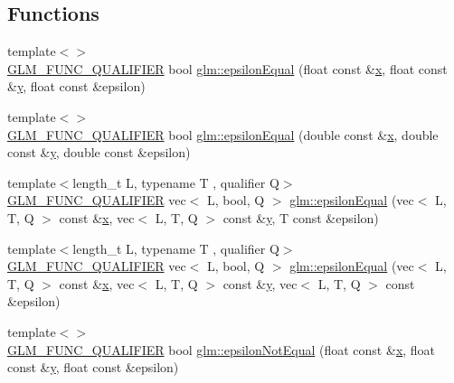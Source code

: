 \subsection*{Functions}
\begin{DoxyCompactItemize}
\item 
{\footnotesize template$<$$>$ }\\\hyperlink{setup_8hpp_a33fdea6f91c5f834105f7415e2a64407}{G\+L\+M\+\_\+\+F\+U\+N\+C\+\_\+\+Q\+U\+A\+L\+I\+F\+I\+ER} bool \hyperlink{namespaceglm_aded5e7ea9a0eacd03367ad77986c2a15}{glm\+::epsilon\+Equal} (float const \&\hyperlink{_s_d_l__opengl_8h_ad0e63d0edcdbd3d79554076bf309fd47}{x}, float const \&\hyperlink{_s_d_l__opengl_8h_a1675d9d7bb68e1657ff028643b4037e3}{y}, float const \&epsilon)
\item 
{\footnotesize template$<$$>$ }\\\hyperlink{setup_8hpp_a33fdea6f91c5f834105f7415e2a64407}{G\+L\+M\+\_\+\+F\+U\+N\+C\+\_\+\+Q\+U\+A\+L\+I\+F\+I\+ER} bool \hyperlink{namespaceglm_a6e30ea38a0e3ebc25d87e667255057e5}{glm\+::epsilon\+Equal} (double const \&\hyperlink{_s_d_l__opengl_8h_ad0e63d0edcdbd3d79554076bf309fd47}{x}, double const \&\hyperlink{_s_d_l__opengl_8h_a1675d9d7bb68e1657ff028643b4037e3}{y}, double const \&epsilon)
\item 
{\footnotesize template$<$length\+\_\+t L, typename T , qualifier Q$>$ }\\\hyperlink{setup_8hpp_a33fdea6f91c5f834105f7415e2a64407}{G\+L\+M\+\_\+\+F\+U\+N\+C\+\_\+\+Q\+U\+A\+L\+I\+F\+I\+ER} vec$<$ L, bool, Q $>$ \hyperlink{group__gtc__epsilon_ga91b417866cafadd076004778217a1844}{glm\+::epsilon\+Equal} (vec$<$ L, T, Q $>$ const \&\hyperlink{_s_d_l__opengl_8h_ad0e63d0edcdbd3d79554076bf309fd47}{x}, vec$<$ L, T, Q $>$ const \&\hyperlink{_s_d_l__opengl_8h_a1675d9d7bb68e1657ff028643b4037e3}{y}, T const \&epsilon)
\item 
{\footnotesize template$<$length\+\_\+t L, typename T , qualifier Q$>$ }\\\hyperlink{setup_8hpp_a33fdea6f91c5f834105f7415e2a64407}{G\+L\+M\+\_\+\+F\+U\+N\+C\+\_\+\+Q\+U\+A\+L\+I\+F\+I\+ER} vec$<$ L, bool, Q $>$ \hyperlink{namespaceglm_a64e220eeafcda3b82fe986e3ce0eac03}{glm\+::epsilon\+Equal} (vec$<$ L, T, Q $>$ const \&\hyperlink{_s_d_l__opengl_8h_ad0e63d0edcdbd3d79554076bf309fd47}{x}, vec$<$ L, T, Q $>$ const \&\hyperlink{_s_d_l__opengl_8h_a1675d9d7bb68e1657ff028643b4037e3}{y}, vec$<$ L, T, Q $>$ const \&epsilon)
\item 
{\footnotesize template$<$$>$ }\\\hyperlink{setup_8hpp_a33fdea6f91c5f834105f7415e2a64407}{G\+L\+M\+\_\+\+F\+U\+N\+C\+\_\+\+Q\+U\+A\+L\+I\+F\+I\+ER} bool \hyperlink{namespaceglm_af4127d65f4afc6e447d461bae25f90fe}{glm\+::epsilon\+Not\+Equal} (float const \&\hyperlink{_s_d_l__opengl_8h_ad0e63d0edcdbd3d79554076bf309fd47}{x}, float const \&\hyperlink{_s_d_l__opengl_8h_a1675d9d7bb68e1657ff028643b4037e3}{y}, float const \&epsilon)

\end{DoxyCompactItemize}
